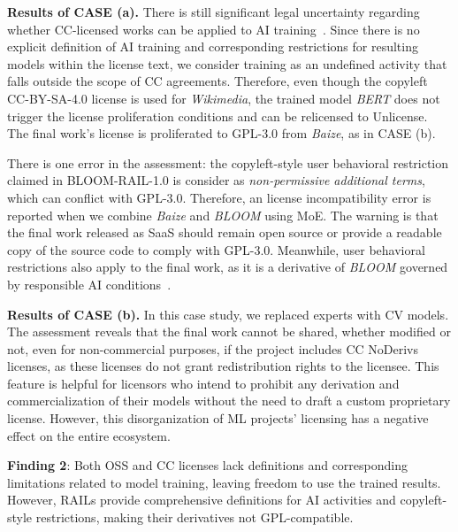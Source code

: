 \textbf{Results of CASE  (a).}
There is still significant legal uncertainty regarding whether CC-licensed works can be applied to AI training~\cite{creative2023artificial}.
Since there is no explicit definition of AI training and corresponding restrictions for resulting models within the license text, we consider training as an undefined activity that falls outside the scope of CC agreements.
Therefore, even though the copyleft CC-BY-SA-4.0 license is used for \textit{Wikimedia}, the trained model \textit{BERT} does not trigger the license proliferation conditions and can be relicensed to Unlicense.
The final work's license is proliferated to GPL-3.0 from \textit{Baize}, as in CASE  (b).

There is one error in the assessment: the copyleft-style user behavioral restriction claimed in BLOOM-RAIL-1.0 is consider as \textit{non-permissive additional terms}, which can conflict with GPL-3.0.
Therefore, an license incompatibility error is reported when we combine \textit{Baize} and \textit{BLOOM} using MoE.
The warning is that the final work released as SaaS should remain open source or provide a readable copy of the source code to comply with GPL-3.0. 
Meanwhile, user behavioral restrictions also apply to the final work, as it is a derivative of \textit{BLOOM} governed by responsible AI conditions~\cite{contractor2022behavioral}.

\textbf{Results of CASE  (b).}
In this case study, we replaced experts with CV models. 
The assessment reveals that the final work cannot be shared, whether modified or not, even for non-commercial purposes, if the project includes CC NoDerivs licenses, as these licenses do not grant redistribution rights to the licensee.
This feature is helpful for licensors who intend to prohibit any derivation and commercialization of their models without the need to draft a custom proprietary license.
However, this disorganization of ML projects' licensing has a negative effect on the entire ecosystem.

\begin{tcolorbox} 
\textbf{Finding 2}: Both OSS and CC licenses lack definitions and corresponding limitations related to model training, leaving freedom to use the trained results. 
However, RAILs provide comprehensive definitions for AI activities and copyleft-style restrictions, making their derivatives not GPL-compatible.
\end{tcolorbox}

